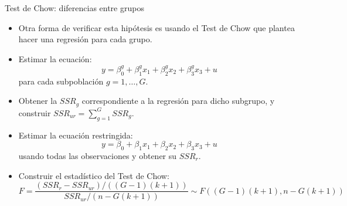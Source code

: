 \documentclass{beamer}
\begin{document}
\begin{frame}[shrink=10]{Test de Chow: diferencias entre grupos}
\begin{itemize}
    \item Otra forma de verificar esta hipótesis es usando el Test de Chow que plantea hacer una regresión para cada grupo.
    \item Estimar la ecuación:
    \[
    y = \beta_{0}^g + \beta_{1}^g x_1 + \beta_{2}^g x_2 + \beta_{3}^g x_3 + u
    \]
    para cada subpoblación \(g = 1, \ldots, G\).
\end{itemize}

\begin{itemize}
    \item Obtener la \(SSR_g\) correspondiente a la regresión para dicho subgrupo, y construir \(SSR_{ur} = \sum_{g=1}^G SSR_g\).
    \item Estimar la ecuación restringida:
    \[
    y = \beta_0 + \beta_1 x_1 + \beta_2 x_2 + \beta_3 x_3 + u
    \]
    usando todas las observaciones y obtener su \(SSR_r\).
\end{itemize}

\begin{itemize}
    \item Construir el estadístico del Test de Chow:
    \[
    F = \frac{(SSR_r - SSR_{ur}) / ((G - 1)(k + 1))}{SSR_{ur} / (n - G(k + 1))} \sim F((G - 1)(k + 1), n - G(k + 1))
    \]
\end{itemize}
\end{frame}
\end{document}
